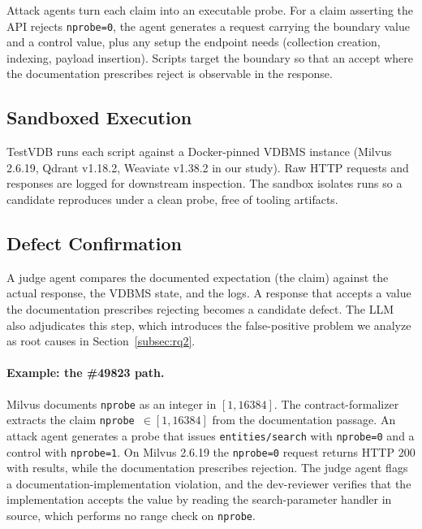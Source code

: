 \documentclass[sigconf]{acmart}
\begin{document}
Attack agents turn each claim into an executable probe. For a claim asserting the API rejects \texttt{nprobe=0}, the agent generates a request carrying the boundary value and a control value, plus any setup the endpoint needs (collection creation, indexing, payload insertion). Scripts target the boundary so that an accept where the documentation prescribes reject is observable in the response.

\subsection{Sandboxed Execution}
\label{subsec:execution}

TestVDB runs each script against a Docker-pinned VDBMS instance (Milvus 2.6.19, Qdrant v1.18.2, Weaviate v1.38.2 in our study). Raw HTTP requests and responses are logged for downstream inspection. The sandbox isolates runs so a candidate reproduces under a clean probe, free of tooling artifacts.

\subsection{Defect Confirmation}
\label{subsec:confirmation}

A judge agent compares the documented expectation (the claim) against the actual response, the VDBMS state, and the logs. A response that accepts a value the documentation prescribes rejecting becomes a candidate defect. The LLM also adjudicates this step, which introduces the false-positive problem we analyze as root causes in Section~\ref{subsec:rq2}.

\paragraph{Example: the \#49823 path.}
Milvus documents \texttt{nprobe} as an integer in $[1, 16384]$. The contract-formalizer extracts the claim \texttt{nprobe}~$\in [1, 16384]$ from the documentation passage. An attack agent generates a probe that issues \texttt{entities/search} with \texttt{nprobe=0} and a control with \texttt{nprobe=1}. On Milvus 2.6.19 the \texttt{nprobe=0} request returns HTTP 200 with results, while the documentation prescribes rejection. The judge agent flags a documentation-implementation violation, and the dev-reviewer verifies that the implementation accepts the value by reading the search-parameter handler in source, which performs no range check on \texttt{nprobe}.
\end{document}

